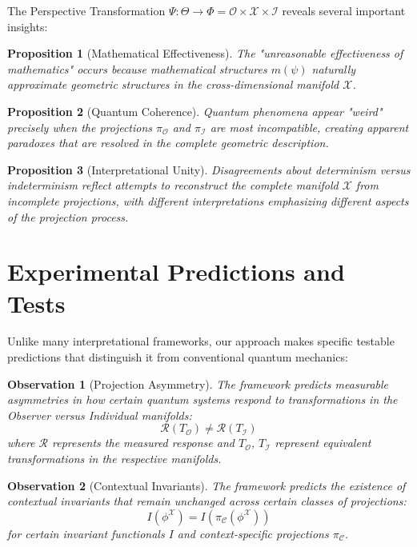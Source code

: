 \documentclass{article}
\newtheorem{proposition}{Proposition}
\newtheorem{observation}{Observation}
\begin{document}
The Perspective Transformation $\Psi: \Theta \to \Phi = \mathcal{O} \times \mathcal{X} \times \mathcal{I}$ reveals several important insights:

\begin{proposition}[Mathematical Effectiveness]
The "unreasonable effectiveness of mathematics" occurs because mathematical structures $m(\psi)$ naturally approximate geometric structures in the cross-dimensional manifold $\mathcal{X}$.
\end{proposition}

\begin{proposition}[Quantum Coherence]
Quantum phenomena appear "weird" precisely when the projections $\pi_{\mathcal{O}}$ and $\pi_{\mathcal{I}}$ are most incompatible, creating apparent paradoxes that are resolved in the complete geometric description.
\end{proposition}

\begin{proposition}[Interpretational Unity]
Disagreements about determinism versus indeterminism reflect attempts to reconstruct the complete manifold $\mathcal{X}$ from incomplete projections, with different interpretations emphasizing different aspects of the projection process.
\end{proposition}

\section{Experimental Predictions and Tests}

Unlike many interpretational frameworks, our approach makes specific testable predictions that distinguish it from conventional quantum mechanics:

\begin{observation}[Projection Asymmetry]
The framework predicts measurable asymmetries in how certain quantum systems respond to transformations in the Observer versus Individual manifolds:
\begin{equation}
\mathcal{R}(T_{\mathcal{O}}) \neq \mathcal{R}(T_{\mathcal{I}})
\end{equation}
where $\mathcal{R}$ represents the measured response and $T_{\mathcal{O}}$, $T_{\mathcal{I}}$ represent equivalent transformations in the respective manifolds.
\end{observation}

\begin{observation}[Contextual Invariants]
The framework predicts the existence of contextual invariants that remain unchanged across certain classes of projections:
\begin{equation}
I(\phi^{\mathcal{X}}) = I(\pi_{\mathcal{C}}(\phi^{\mathcal{X}}))
\end{equation}
for certain invariant functionals $I$ and context-specific projections $\pi_{\mathcal{C}}$.
\end{observation}
\end{document}
